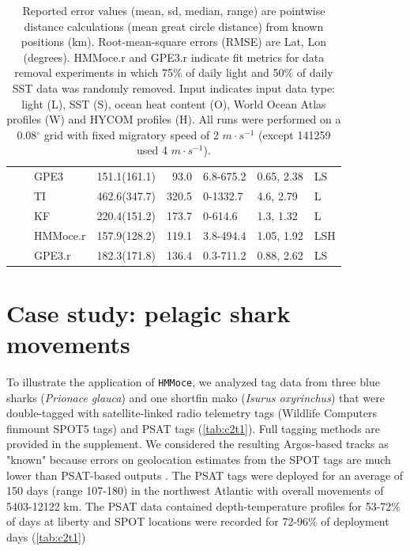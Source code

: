 \begin{table}[h!]
\begin{tabular}[t]{lrllrlll}
 &  & GPE3 & 151.1(161.1) & 93.0 & 6.8-675.2 & 0.65, 2.38 & LS\\
 &  & TI & 462.6(347.7) & 320.5 & 0-1332.7 & 4.6, 2.79 & L\\
 &  & KF & 220.4(151.2) & 173.7 & 0-614.6 & 1.3, 1.32 & L\\
 &  & HMMoce.r & 157.9(128.2) & 119.1 & 3.8-494.4 & 1.05, 1.92 & LSH\\
 &  & GPE3.r & 182.3(171.8) & 136.4 & 0.3-711.2 & 0.88, 2.62 & LS\\
\bottomrule
\end{tabular}
\caption*{Reported error values (mean, sd, median, range) are pointwise distance calculations (mean great circle distance) from known positions (km). Root-mean-square errors (RMSE) are Lat, Lon (degrees). HMMoce.r and GPE3.r indicate fit metrics for data removal experiments in which 75\% of daily light and 50\% of daily SST data was randomly removed. Input indicates input data type: light (L), SST (S), ocean heat content (O), World Ocean Atlas profiles (W) and HYCOM profiles (H). All runs were performed on a 0.08$^{\circ}$ grid with fixed
migratory speed of 2 $m \cdot s^{-1}$ (except 141259 used 4 $m \cdot s^{-1}$).}
\end{table}

\section{Case study: pelagic shark
movements}

To illustrate the application of \texttt{HMMoce}, we analyzed tag data
from three blue sharks (\emph{Prionace glauca}) and one shortfin mako
(\emph{Isurus oxyrinchus}) that were double-tagged with satellite-linked
radio telemetry tags (Wildlife Computers finmount SPOT5 tags) and PSAT
tags (\cref{tab:c2t1}). Full tagging methods are provided in the
supplement. We considered the resulting Argos-based tracks as "known"
because errors on geolocation estimates from the SPOT tags are much
lower \citep[typically \textless{} 10 km;][]{Witt2010, Patterson2010}
than PSAT-based outputs \citep[\textgreater{} 50 km;][]{Winship2012}.
The PSAT tags were deployed for an average of 150 days (range 107-180)
in the northwest Atlantic with overall movements of 5403-12122 km. The
PSAT data contained depth-temperature profiles for 53-72\% of days at
liberty and SPOT locations were recorded for 72-96\% of deployment days
(\cref{tab:c2t1})

